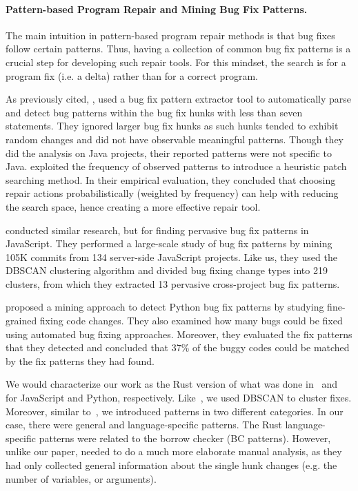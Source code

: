 \paragraph{Pattern-based Program Repair and Mining Bug Fix Patterns.}
The main intuition in pattern-based program repair methods is that bug fixes follow certain patterns. Thus, having a collection of common bug fix patterns is a crucial step for developing such repair tools. For this mindset, the search is for a program fix (i.e. a delta) rather than for a correct program.

As previously cited, \cite{pan2009toward}, used a bug fix pattern extractor tool to automatically parse and detect bug patterns within the bug fix hunks with less than seven statements. They ignored larger bug fix hunks as such hunks tended to exhibit random changes and did not have observable meaningful patterns. Though they did the analysis on Java projects, their reported patterns were not specific to Java. \cite{martinez2015mining,martinez2012mining} exploited the frequency of observed patterns to introduce a heuristic patch searching method. In their empirical evaluation, they concluded that choosing repair actions probabilistically (weighted by frequency) can help with reducing the search space, hence creating a more effective repair tool.

\cite{hanam2016discovering} conducted similar research, but for finding pervasive bug fix patterns in JavaScript. They performed a large-scale study of bug fix patterns by mining 105K commits from 134 server-side JavaScript projects. Like us, they used the DBSCAN clustering algorithm and divided bug fixing change types into 219 clusters, from which they extracted 13 pervasive cross-project bug fix patterns. 

\cite{yang2022mining} proposed a mining approach to detect Python bug fix patterns by studying fine-grained fixing code changes. They also examined how many bugs could be fixed using automated bug fixing approaches. Moreover, they evaluated the fix patterns that they detected and concluded that 37\% of the buggy codes could be matched by the fix patterns they had found. 

We would characterize our work as the Rust version of what was done in~\cite{hanam2016discovering} and~\cite{yang2022mining} for JavaScript and Python, respectively. Like~\cite{hanam2016discovering}, we used DBSCAN to cluster fixes. Moreover, similar to~\cite{yang2022mining}, we introduced patterns in two different categories. In our case, there were general and language-specific patterns. The Rust language-specific patterns were related to the borrow checker (BC patterns). However, unlike our paper, \cite{yang2022mining} needed to do a much more elaborate manual analysis, as they had only collected general information about the single hunk changes (e.g. the number of variables, or arguments).

